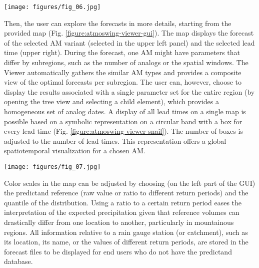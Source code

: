 \documentclass[review]{elsarticle}
\begin{document}
\begin{figure*}[hbt!]
	\texttt{[image: figures/fig\_06.jpg]}
	\caption{Graphical user interface of the Viewer module (Elevation data from The Shuttle Radar Topography Mission (SRTM), and hydrological network from SwissTopo).}
	\label{figure:atmoswing-viewer-gui}
\end{figure*}

Then, the user can explore the forecasts in more details, starting from the provided map (Fig. \ref{figure:atmoswing-viewer-gui}). The map displays the forecast of the selected AM variant (selected in the upper left panel) and the selected lead time (upper right). During the forecast, one AM might have parameters that differ by subregions, such as the number of analogs or the spatial windows. The Viewer automatically gathers the similar AM types and provides a composite view of the optimal forecasts per subregion. The user can, however, choose to display the results associated with a single parameter set for the entire region (by opening the tree view and selecting a child element), which provides a homogeneous set of analog dates. A display of all lead times on a single map is possible based on a symbolic representation on a circular band with a box for every lead time (Fig. \ref{figure:atmoswing-viewer-snail}). The number of boxes is adjusted to the number of lead times. This representation offers a global spatiotemporal visualization for a chosen AM.

\begin{figure*}[hbt!]
	\texttt{[image: figures/fig\_07.jpg]}
	\caption{Visualization of multiple lead times on the map (Elevation data from the SRTM, and hydrological network from SwissTopo).}
	\label{figure:atmoswing-viewer-snail}
\end{figure*}

Color scales in the map can be adjusted by choosing (on the left part of the GUI) the predictand reference (raw value or ratio to different return periods) and the quantile of the distribution. Using a ratio to a certain return period eases the interpretation of the expected precipitation given that reference volumes can drastically differ from one location to another, particularly in mountainous regions. All information relative to a rain gauge station (or catchment), such as its location, its name, or the values of different return periods, are stored in the forecast files to be displayed for end users who do not have the predictand database.
\end{document}
